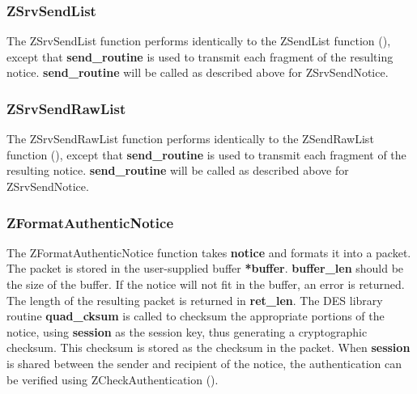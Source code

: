 \subsubsection{ZSrvSendList}
\label{ZSrvSendList}

\etemplate
{}

The ZSrvSendList function performs identically to the ZSendList function
(), except that {\bf send_routine} is used to transmit
each fragment of the resulting notice.  {\bf send_routine} will be
called as described above for ZSrvSendNotice.

\subsubsection{ZSrvSendRawList}
\label{ZSrvSendRawList}

\etemplate
{}

The ZSrvSendRawList function performs identically to the ZSendRawList
function (), except that {\bf send_routine} is used
to transmit each fragment of the resulting notice.  {\bf send_routine}
will be called as described above for ZSrvSendNotice.

\subsubsection{ZFormatAuthenticNotice}
\label{ZFormatAuthenticNotice}

\etemplate
{}

The ZFormatAuthenticNotice function takes {\bf notice} and formats it
into a packet.  The packet is stored in the user-supplied buffer {\bf
*buffer}.  {\bf buffer_len} should be the size of the buffer.  If the
notice will not fit in the buffer, an error is returned.  The length of
the resulting packet is returned in {\bf *ret_len}. The DES library
routine {\bf quad_cksum} is called to checksum the appropriate portions
of the notice, using {\bf session} as the session key, thus generating a
cryptographic checksum.  This checksum is stored as the checksum in the
packet.  When {\bf session} is shared between the sender and recipient
of the notice, the authentication can be verified using
ZCheckAuthentication ().
